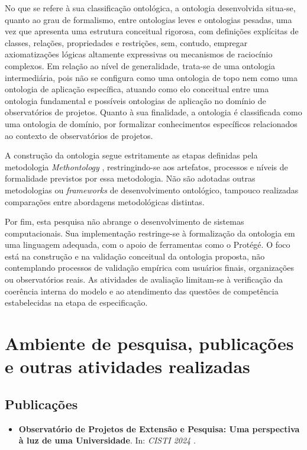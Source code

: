 No que se refere à sua classificação ontológica, a ontologia desenvolvida situa-se, quanto ao grau de formalismo, entre ontologias leves e ontologias pesadas, uma vez que apresenta uma estrutura conceitual rigorosa, com definições explícitas de classes, relações, propriedades e restrições, sem, contudo, empregar axiomatizações lógicas altamente expressivas ou mecanismos de raciocínio complexos. Em relação ao nível de generalidade, trata-se de uma ontologia intermediária, pois não se configura como uma ontologia de topo nem como uma ontologia de aplicação específica, atuando como elo conceitual entre uma ontologia fundamental e possíveis ontologias de aplicação no domínio de observatórios de projetos. Quanto à sua finalidade, a ontologia é classificada como uma ontologia de domínio, por formalizar conhecimentos específicos relacionados ao contexto de observatórios de projetos.

A construção da ontologia segue estritamente as etapas definidas pela metodologia \textit{Methontology} \cite{fernandez1997methontology}, restringindo-se aos artefatos, processos e níveis de formalidade previstos por essa metodologia. Não são adotadas outras metodologias ou \textit{frameworks} de desenvolvimento ontológico, tampouco realizadas comparações entre abordagens metodológicas distintas.

Por fim, esta pesquisa não abrange o desenvolvimento de sistemas computacionais. Sua implementação restringe-se à formalização da ontologia em uma linguagem adequada, com o apoio de ferramentas como o Protégé. O foco está na construção e na validação conceitual da ontologia proposta, não contemplando processos de validação empírica com usuários finais, organizações ou observatórios reais. As atividades de avaliação limitam-se à verificação da coerência interna do modelo e ao atendimento das questões de competência estabelecidas na etapa de especificação.

\section{Ambiente de pesquisa, publicações e outras atividades realizadas}
\subsection{Publicações}
\begin{itemize}
    \item \textbf{Observatório de Projetos de Extensão e Pesquisa: Uma perspectiva à luz de uma Universidade}. In: \textit{CISTI 2024} \cite{jose2024cisti}.
\end{itemize}


